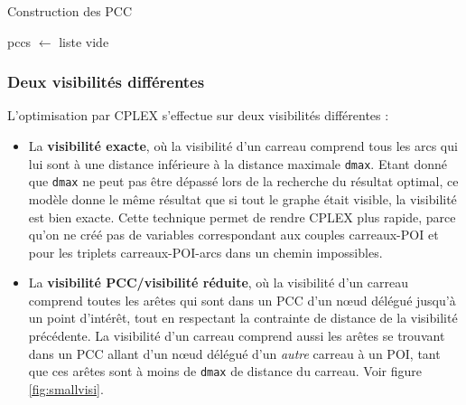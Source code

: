 \begin{algorithm}[!ht]
\DontPrintSemicolon
\caption{Construction des PCC}
\label{algo:const_pcc}
pccs $\leftarrow$ liste vide \;
\end{algorithm}

\subsubsection{Deux visibilités différentes} \label{sect:2visi}

L'optimisation par CPLEX s'effectue sur deux visibilités différentes : 

\begin{itemize}
    \item La \textbf{visibilité exacte}, où la visibilité d'un carreau comprend tous les arcs qui lui sont à une distance inférieure à la distance maximale \texttt{dmax}. Etant donné que \texttt{dmax} ne peut pas être dépassé lors de la recherche du résultat optimal, ce modèle donne le même résultat que si tout le graphe était visible, la visibilité est bien exacte. Cette technique permet de rendre CPLEX plus rapide, parce qu'on ne créé pas de variables correspondant aux couples carreaux-POI et pour les triplets carreaux-POI-arcs dans un chemin impossibles.

    \item La \textbf{visibilité PCC/visibilité réduite}, où la visibilité d'un carreau comprend toutes les arêtes qui sont dans un PCC d'un nœud délégué jusqu'à un point d'intérêt, tout en respectant la contrainte de distance de la visibilité précédente. La visibilité d'un carreau comprend aussi les arêtes se trouvant dans un PCC allant d'un nœud délégué d'un \emph{autre} carreau à un POI, tant que ces arêtes sont à moins de \texttt{dmax} de distance du carreau. Voir figure \ref{fig:smallvisi}.
\end{itemize} 

